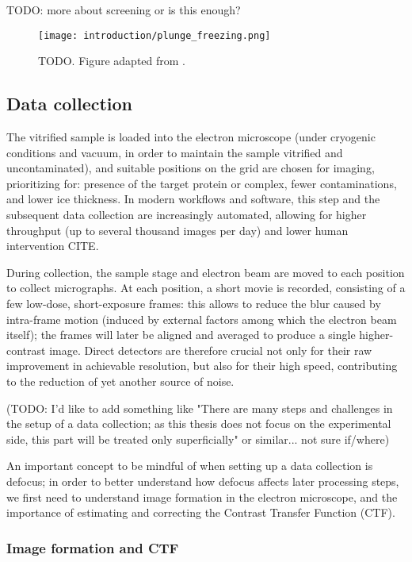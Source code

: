 TODO: more about screening or is this enough?

\begin{figure}[ht]
    \centering
    \texttt{[image: introduction/plunge\_freezing.png]}
    \caption[Vitrification via plunge freezing]{TODO. Figure adapted from \citet{chungNobelPrizeChemistry2017}.}
    \label{fig:plunge_freezing}
\end{figure}

\subsection{Data collection}
The vitrified sample is loaded into the electron microscope (under cryogenic conditions and vacuum, in order to maintain the sample vitrified and uncontaminated), and suitable positions on the grid are chosen for imaging, prioritizing for: presence of the target protein or complex, fewer contaminations, and lower ice thickness. In modern workflows and software, this step and the subsequent data collection are increasingly automated, allowing for higher throughput (up to several thousand images per day) and lower human intervention CITE.

During collection, the sample stage and electron beam are moved to each position to collect micrographs. At each position, a short movie is recorded, consisting of a few low-dose, short-exposure frames: this allows to reduce the blur caused by intra-frame motion (induced by external factors among which the electron beam itself); the frames will later be aligned and averaged to produce a single higher-contrast image. Direct detectors are therefore crucial not only for their raw improvement in achievable resolution, but also for their high speed, contributing to the reduction of yet another source of noise.

(TODO: I'd like to add something like "There are many steps and challenges in the setup of a data collection; as this thesis does not focus on the experimental side, this part will be treated only superficially" or similar... not sure if/where)

An important concept to be mindful of when setting up a data collection is defocus; in order to better understand how defocus affects later processing steps, we first need to understand image formation in the electron microscope, and the importance of estimating and correcting the Contrast Transfer Function (CTF).

\subsubsection{Image formation and CTF}

